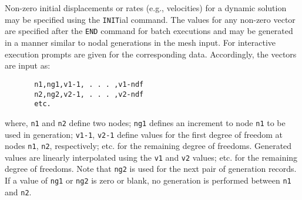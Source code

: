  \\{\smallskip}
 \\{\smallskip}
\headb

Non-zero initial displacements or rates (e.g., velocities)
for a dynamic solution may be specified using the
{\tt INIT}ial command.  The values for  any  non-zero  vector
are  specified after the {\tt END} command for batch executions
and may be generated in a manner similar to nodal
generations in the mesh input.  For interactive execution
prompts are given for the corresponding data.   Accordingly,
the vectors are input as:

\begin{verbatim}
       n1,ng1,v1-1, . . . ,v1-ndf
       n2,ng2,v2-1, . . . ,v2-ndf
       etc.
\end{verbatim}
where, {\tt n1} and {\tt n2} define  two  nodes;  {\tt ng1}  defines  an
increment  to  node  {\tt n1}  to be used in generation; {\tt v1-1},
{\tt v2-1} define values for the  first  degree  of  freedom  at
nodes  {\tt n1},  {\tt n2},  respectively;  etc.  for  the remaining
degree of freedoms.  Generated values are linearly  interpolated
using the {\tt v1} and {\tt v2} values; etc.  for the remaining
degree of freedoms.  Note that {\tt ng2}  is  used  for  the
next  pair  of  generation  records.  If a value of {\tt ng1} or
{\tt ng2} is zero or blank, no generation is  performed  between
{\tt n1} and {\tt n2}.
\vfill\eject
